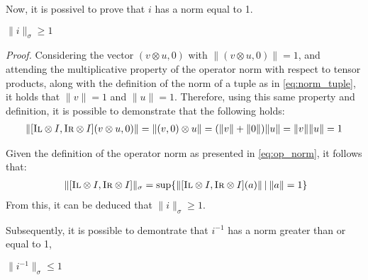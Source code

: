 Now, it is possivel to prove that $i$ has a norm equal to 1.

\begin{lemma} \label{lem3}
  $  \lVert i\rVert_{\sigma} \geq 1 $
\end{lemma}

\vspace{10pt}

\textit{Proof.} \quad Considering the vector $(v \otimes u, 0)$ with $\lVert(v \otimes u, 0)\rVert = 1$, and  attending the multiplicative property of the operator norm with respect to tensor products, along with the definition of the norm of a tuple as in \autoref{eq:norm_tuple}, it holds that $\lVert v \rVert = 1$ and $\lVert u \rVert =1$. Therefore, using this same property and definition, it is possible to demonstrate that the following holds:
  \begin{equation}
    \begin{split}
      \lVert [\textsc{Il} \otimes I, \textsc{Ir} \otimes I ] (v \otimes u, 0) \rVert = \lVert(v, 0) \otimes u \rVert = (\lVert v \rVert + \lVert 0 \rVert ) \lVert u \rVert = \lVert v \rVert \lVert u \rVert =1
    \end{split}
  \end{equation}
 
Given the definition of the operator norm as presented in \autoref{eq:op_norm}, it follows that:
\begin{equation}
  \begin{split}
      & \hspace{3pt} \lVert [\textsc{Il} \otimes I, \textsc{Ir} \otimes I ]  \rVert_{\sigma}  = \text{sup} \{ \lVert [\textsc{Il} \otimes I , \textsc{Ir} \otimes I ] (a) \rVert \hspace{2pt} | \hspace{2pt} \lVert a \rVert = 1 \} \\
  \end{split}
  \end{equation}
  From this, it can be deduced that $\lVert i \rVert_{\sigma} \geq 1$.

Subsequently, it is possible to demontrate that $i^{-1}$ has a norm greater than or equal to 1,

\begin{lemma} \label{lem4}
  $  \lVert i^{-1}  \rVert_{\sigma} \leq 1 $
\end{lemma}

